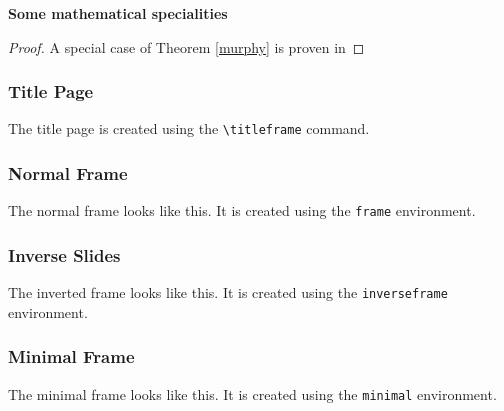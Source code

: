 \documentclass{beamer}
\begin{document}
\begin{frame}
\textbf{Some mathematical specialities}


\begin{proof}
  A special case of Theorem \ref{murphy} is proven in %
\end{proof}
\end{frame}

\begin{frame}
\frametitle{Title Page}
The title page is created using the \texttt{\textbackslash titleframe} command.
\end{frame}

\begin{frame}
\frametitle{Normal Frame}
The normal frame looks like this. It is created using the \texttt{frame} environment.
\end{frame}

\begin{inverseframe}
  \frametitle{Inverse Slides}
The inverted frame looks like this. It is created using the \texttt{inverseframe} environment.
 
\end{inverseframe}

\begin{minimalframe}
  \frametitle{Minimal Frame}
The minimal frame looks like this. It is created using the \texttt{minimal} environment.
  
\end{minimalframe}
\end{document}
